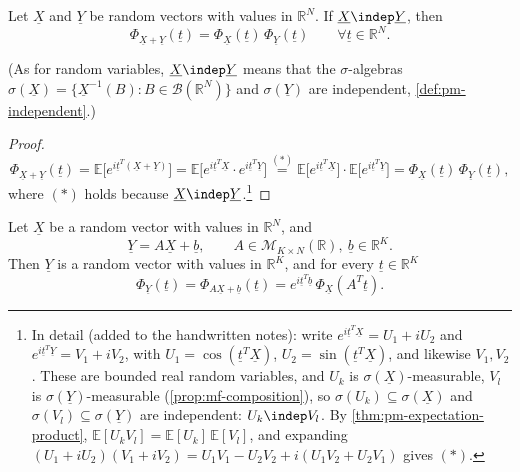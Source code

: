 \begin{proposition}\label{prop:cf-independence}
Let $\underline X$ and $\underline Y$ be random vectors with values in $\mathbb R^N$. If
$\underline X\indep\underline Y$, then
\[
  \Phi_{\underline X+\underline Y}(\underline t)=\Phi_{\underline X}(\underline t)\,\Phi_{\underline Y}(\underline t)
  \qquad\forall\underline t\in\mathbb R^N .
\]
\end{proposition}

(As for random variables, $\underline X\indep\underline Y$ means that the $\sigma$-algebras
$\sigma(\underline X)=\{\underline X^{-1}(B):B\in\mathcal B(\mathbb R^N)\}$ and
$\sigma(\underline Y)$ are independent, \cref{def:pm-independent}.)

\begin{proof}
\[
  \Phi_{\underline X+\underline Y}(\underline t)=\mathbb E\big[e^{i\underline t^T(\underline X+\underline Y)}\big]
  =\mathbb E\big[e^{i\underline t^T\underline X}\cdot e^{i\underline t^T\underline Y}\big]
  \overset{(\ast)}{=}\mathbb E\big[e^{i\underline t^T\underline X}\big]\cdot\mathbb E\big[e^{i\underline t^T\underline Y}\big]
  =\Phi_{\underline X}(\underline t)\,\Phi_{\underline Y}(\underline t),
\]
where $(\ast)$ holds because $\underline X\indep\underline Y$.\footnote{In detail (added to the
handwritten notes): write $e^{i\underline t^T\underline X}=U_1+iU_2$ and
$e^{i\underline t^T\underline Y}=V_1+iV_2$, with $U_1=\cos(\underline t^T\underline X)$,
$U_2=\sin(\underline t^T\underline X)$, and likewise $V_1,V_2$. These are bounded real random
variables, and $U_k$ is $\sigma(\underline X)$-measurable, $V_l$ is
$\sigma(\underline Y)$-measurable (\cref{prop:mf-composition}), so
$\sigma(U_k)\subseteq\sigma(\underline X)$ and $\sigma(V_l)\subseteq\sigma(\underline Y)$ are
independent: $U_k\indep V_l$. By \cref{thm:pm-expectation-product},
$\mathbb E[U_kV_l]=\mathbb E[U_k]\,\mathbb E[V_l]$, and expanding
$(U_1+iU_2)(V_1+iV_2)=U_1V_1-U_2V_2+i(U_1V_2+U_2V_1)$ gives $(\ast)$.}
\end{proof}

\begin{proposition}\label{prop:cf-affine}
Let $\underline X$ be a random vector with values in $\mathbb R^N$, and
\[
  \underline Y=A\underline X+\underline b,\qquad A\in\mathcal M_{K\times N}(\mathbb R),\
  \underline b\in\mathbb R^K .
\]
Then $\underline Y$ is a random vector with values in $\mathbb R^K$, and for every
$\underline t\in\mathbb R^K$
\[
  \Phi_{\underline Y}(\underline t)=\Phi_{A\underline X+\underline b}(\underline t)
  =e^{i\underline t^T\underline b}\,\Phi_{\underline X}(A^T\underline t).
\]
\end{proposition}

